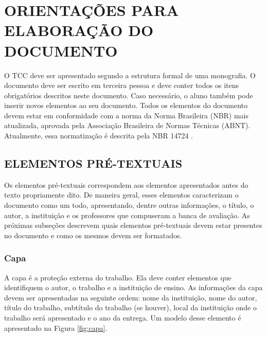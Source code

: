 \chapter{ORIENTAÇÕES PARA ELABORAÇÃO DO DOCUMENTO} \label{chap:orientacoes}

O TCC deve ser apresentado segundo a estrutura formal de uma monografia. O documento deve ser escrito em terceira pessoa e deve conter todos os itens obrigatórios descritos neste documento. Caso necessário, o aluno também pode inserir novos elementos ao seu documento. Todos os elementos do documento devem estar em conformidade com a norma da Norma Brasileira (NBR) mais atualizada, aprovada pela Associação Brasileira de Normas Técnicas (ABNT). Atualmente, essa normatização é descrita pela NBR 14724 \cite{NBR14724:2011}.

\section{ELEMENTOS PRÉ-TEXTUAIS}

Os elementos pré-textuais correspondem aos elementos apresentados antes do texto propriamente dito. De maneira geral, esses elementos caracterizam o documento como um todo, apresentando, dentre outras informações, o título, o autor, a instituição e os professores que compuseram a banca de avaliação. As próximas subseções descrevem quais elementos pré-textuais devem estar presentes no documento e como os mesmos devem ser formatados.

\subsection{Capa}

A capa é a  proteção externa do trabalho. Ela deve conter elementos que identifiquem o autor,  o trabalho e a instituição de ensino. As informações da capa devem ser apresentadas na seguinte ordem: nome da instituição, nome do autor, título do trabalho, subtítulo do trabalho (se houver), local da instituição onde o trabalho será apresentado e o ano da entrega. Um modelo desse elemento é apresentado na Figura \ref{fig:capa}.

